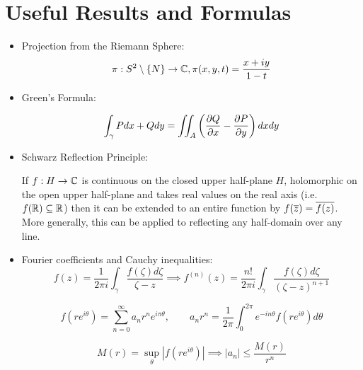 \documentclass{article}
\begin{document}
\section{Useful Results and Formulas}

\begin{itemize}

  \item Projection from the Riemann Sphere:
  \begin{equation}
    \pi: S^2 \setminus \{N\} \to \mathbb{C}, \pi(x, y, t) = \frac{x + iy}{1 - t}
  \end{equation}

  \item Green's Formula:
  \begin{theorem}
    \begin{equation}
      \int_\gamma Pdx + Qdy
      = \iint_A\left({\frac{\partial {Q}}{\partial {x}}} - {\frac{\partial {P}}{\partial {y}}}\right)dxdy
    \end{equation}
  \end{theorem}

  \item Schwarz Reflection Principle:
  \begin{theorem}
    If \(f: H \to \mathbb{C}\) is continuous on the closed upper half-plane \(H\), holomorphic on the open upper half-plane and takes real values on the real axis (i.e. \(f(\mathbb{R}) \subseteq \mathbb{R}\)) then it can be extended to an entire function by \(f(\overline{z}) = \overline{f(z)}\). More generally, this can be applied to reflecting any half-domain over any line.
  \end{theorem}

  \item Fourier coefficients and Cauchy inequalities:
  \begin{equation}
    f(z) = \frac{1}{2\pi i}\int_\gamma\frac{f(\zeta)d\zeta}{\zeta - z} \implies f^{(n)}(z) = \frac{n!}{2\pi i}\int_\gamma\frac{f(\zeta)d\zeta}{(\zeta - z)^{n + 1}}
  \end{equation}

  \begin{equation}
    f(re^{i\theta}) = \sum_{n = 0}^\infty a_nr^ne^{i\pi\theta}, \qquad a_nr^n = \frac{1}{2\pi}\int_0^{2\pi}e^{-in\theta}f(re^{i\theta})d\theta
  \end{equation}

  \begin{equation}
    M(r) = \sup_\theta|f(re^{i\theta})| \implies |a_n| \leq \frac{M(r)}{r^n}
  \end{equation}


\end{itemize}
\end{document}
